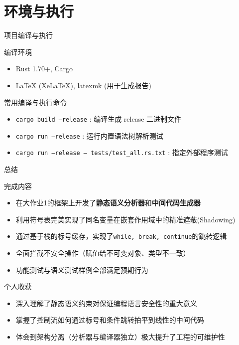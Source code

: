 \documentclass[aspectratio=169]{ctexbeamer}
\begin{document}
\section{环境与执行}

\begin{frame}{项目编译与执行}
    \begin{block}{编译环境}
        \begin{itemize}
            \item Rust 1.70+, Cargo
            \item LaTeX (XeLaTeX), latexmk (用于生成报告)
        \end{itemize}
    \end{block}
    \vfill
    \begin{block}{常用编译与执行命令}
        \begin{itemize}
            \item \texttt{cargo build --release} : 编译生成 release 二进制文件
            \item \texttt{cargo run --release} : 运行内置语法树解析测试
            \item \texttt{cargo run --release -- tests/test\_all.rs.txt} : 指定外部程序测试
        \end{itemize}
    \end{block}
\end{frame}

\begin{frame}{总结}
    \begin{block}{完成内容}
        \begin{itemize}
            \item 在大作业1的框架上开发了\textbf{静态语义分析器}和\textbf{中间代码生成器}
            \item 利用符号表完美实现了同名变量在嵌套作用域中的精准遮蔽(Shadowing)
            \item 通过基于栈的标号缓存，实现了\texttt{while, break, continue}的跳转逻辑
            \item 全面拦截不安全操作（赋值给不可变对象、类型不一致）
            \item 功能测试与语义测试样例全部满足预期行为
        \end{itemize}
    \end{block}
    \vfill
    \begin{block}{个人收获}
        \begin{itemize}
            \item 深入理解了静态语义约束对保证编程语言安全性的重大意义
            \item 掌握了控制流如何通过标号和条件跳转拍平到线性的中间代码
            \item 体会到架构分离（分析器与编译器独立）极大提升了工程的可维护性
        \end{itemize}
    \end{block}
\end{frame}
\end{document}
